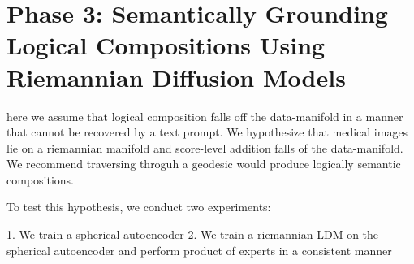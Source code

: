 \section{Phase 3: Semantically Grounding Logical Compositions Using Riemannian Diffusion Models}


here we assume that logical composition falls off the data-manifold in a manner that cannot be recovered by a text prompt. 
We hypothesize that medical images lie on a riemannian manifold and score-level addition falls of the data-manifold. 
We recommend traversing throguh a geodesic would produce logically semantic compositions.

To test this hypothesis, we conduct two experiments:

1. We train a spherical autoencoder
2. We train a riemannian LDM on the spherical autoencoder and perform product of experts in a consistent manner
